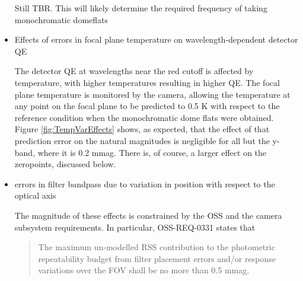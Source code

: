 \documentclass[12pt,preprint]{aastex}
\begin{document}
\begin{itemize}
Still TBR.  This will likely determine the required frequency of taking monochromatic domeflats

\item{Effects of errors in focal plane temperature on wavelength-dependent detector QE}

The detector QE at wavelengths near the red cutoff is affected by temperature, with higher temperatures resulting in higher QE.
The focal plane temperature is monitored by the camera, allowing the temperature at any point on the focal plane to be predicted to
0.5 K with respect to the reference condition when the monochromatic dome flats were obtained.  Figure \ref{fig:TempVarEffects}
shows, as expected, that the effect of that prediction error on the natural magnitudes is negligible for all but the y-band, where 
it is 0.2 mmag.   There is, of course, a larger effect on the zeropoints, discussed below.

\item{errors in filter bandpass due to variation in position with respect to the optical axis}

The magnitude of these effects is constrained by the OSS and
the camera subsystem requirements.   In particular, OSS-REQ-0331 states that

\begin{quote}
The maximum un-modelled RSS contribution to the photometric repeatability 
budget from filter placement errors and/or response variations over the FOV shall
be no more than 0.5 mmag.
\end{quote}

\end{itemize}
\end{document}
